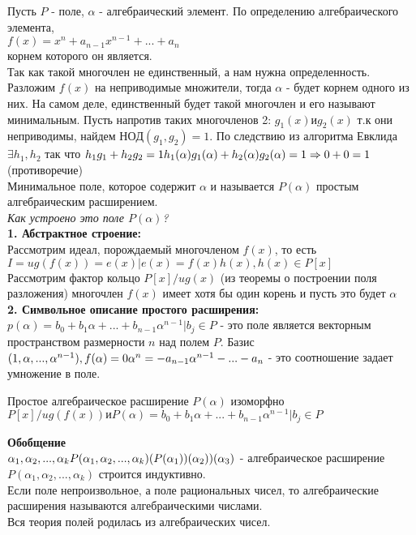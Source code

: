 Пусть $P$ - поле, $\alpha$ - алгебраический элемент. По определению
алгебраического элемента,\\
$f(x) = x^{n} + a_{n-1}x^{n-1} +...+a_{n}$\\
корнем которого он является.\\
Так как такой многочлен не единственный, а нам нужна определенность. Разложим
$f(x)$ на неприводимые множители, тогда $\alpha$ - будет корнем одного из них.
На самом деле, единственный будет такой многочлен и его называют минимальным.
Пусть напротив таких многочленов 2: $g_{1}(x) и g_{2}(x)$ т.к они неприводимы,
найдем
$НОД(g_{1}, g_{2}) = 1$. По следствию из алгоритма Евклида
$\exists h_{1}, h_{2}$ так что $h_{1}g_{1} + h_{2}g_{2} = 1\\
h_{1}(\alpha)g_{1}(\alpha) + h_{2}(\alpha)g_{2}(\alpha) = 1 \Rightarrow 0 + 0
= 1$ (противоречие)\\
Минимальное поле, которое содержит $\alpha$ и называется $P(\alpha)$ простым
алгебраическим расширением.\\
{\emph{Как устроено это поле $P(\alpha)$?}}\\
{\bfseries 1. Абстрактное строение:}\\
Рассмотрим идеал, порождаемый многочленом $f(x)$, то есть\\
 $I = ug(f(x)) = {e(x)| e(x) = f(x)h(x), h(x) \in P[x]}$\\
 Рассмотрим фактор кольцо $P[x]/ug(x)$ (из теоремы о построении поля разложения)
многочлен $f(x)$ имеет хотя бы один корень и пусть это будет $\alpha$\\
{\bfseries 2. Символьное описание простого расширения:}\\
$p(\alpha) = {b_{0}+b_{1}\alpha+...+b_{n-1}\alpha^{n-1}| b_{j}\in P}$ - это поле
является векторным пространством размерности $n$ над полем $P$. Базис
$(1, \alpha,...,\alpha^{n-1}), f(\alpha) = 0\\
\alpha^{n} = -a_{n-1}\alpha^{n-1}-...-a_{n}$ - это соотношение задает умножение
в поле.\\

\begin{theorem}
  Простое алгебраическое расширение $P(\alpha)$ изоморфно\\
$P[x]/ug(f(x)) и P(\alpha) = {b_0 + b_1\alpha +...+b_{n-1}\alpha^{n-1}|
b_j \in P}$\\
\end{theorem}

{\bfseries Обобщение}\\
$\alpha_1, \alpha_2,..., \alpha_k\\
P(\alpha_1, \alpha_2,..., \alpha_k)\\
(P(\alpha_1))(\alpha_2))(\alpha_3)$ - алгебраическое расширение
$P(\alpha_1, \alpha_2,..., \alpha_k)$ строится индуктивно.\\
Если поле непроизвольное, а поле рациональных чисел, то алгебраические
расширения
называются алгебраическими числами.\\
Вся теория полей родилась из алгебраических чисел.\\


